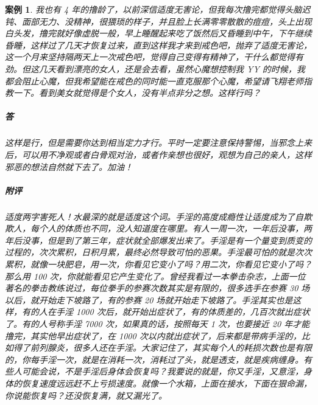 \documentclass{ctexart}
\newtheorem{case}{案例}
\begin{document}
\begin{case}
    我也有 4 年的撸龄了，以前深信适度无害论，但我每次撸完都觉得头脑迟钝、面部无力、没精神，很猥琐的样子，并且脸上长满零零散散的痘痘，头上出现白头发，撸完就好像虚脱一般，早上睡醒起来吃了饭然后又昏睡到中午，下午继续昏睡，这样过了几天才恢复过来，直到这样我才来到戒色吧，抛弃了适度无害论，这一个月来坚持隔两天上一次戒色吧，觉得自己变得有精神了，干什么都觉得有劲。但这几天看到漂亮的女人，还是会去看，虽然心魔想控制我 YY 的时候，我都会阻止心魔，但我希望能在戒色的同时能一直克服那个心魔，希望请飞翔老师指教一下。看到美女就觉得是个女人，没有半点非分之想。这样行吗？
    \subparagraph{答} 这样是行，但是需要你达到相当定力才行。平时一定要注意保持警惕，当邪念上来后，可以用不净观或者白骨观对治，或者作亲想也很好，观想为自己的亲人，这样邪恶的想法自然就下去了。加油！
    \subparagraph{附评} 适度两字害死人！水最深的就是适度这个词。手淫的高度成瘾性让适度成为了自欺欺人，每个人的体质也不同，没人知道度在哪里。有人一周一次，一年后没事，两年后没事，但是到了第三年，症状就全部爆发出来了。手淫是有一个量变到质变的过程的，次次累积，日积月累，最终必然导致可怕的恶果。手淫最可怕的就是次次累积，就像一块肥皂，用一次，你看见它变小了吗？用二次，你看见它变小了吗？那么用 100 次，你就能看见它产生变化了。曾经我看过一本拳击杂志，上面一位著名的拳击教练说过，每位拳手的参赛次数其实是有限的，很多选手在参赛 30 场以后，就开始走下坡路了，有的参赛 20 场就开始走下坡路了。手淫其实也是这样，有的人在手淫 1000 次后，就开始出症状了，有的体质差的，几百次就出症状了。有的人号称手淫 7000 次，如果真的话，按照每天 1 次，也要接近 20 年才能撸完，其实他早出症状了，在 1000 次以内就出症状了，后来都是带病手淫的，比如得了前列腺炎，很多人还在手淫。大家记住了，其实每个人的耗损次数也是有限的，你每手淫一次，就是在消耗一次，消耗过了头，就是透支，就是疾病缠身。有些人可能会说，不是手淫后身体会恢复吗？我要说的就是，你又手淫，又意淫，身体的恢复速度远远赶不上亏损速度。就像一个水箱，上面在接水，下面在狠命漏，你说能恢复吗？还没恢复满，就又漏光了。


\end{case}
\end{document}
